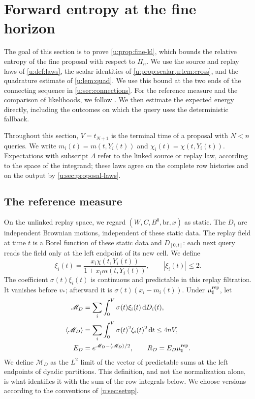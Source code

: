 \chapter{Forward entropy at the fine horizon}\label{u:sec:fine}

The goal of this section is to prove \cref{u:prop:fine-kl}, which bounds
the relative entropy of the fine proposal with respect to $\Pi_n$.
We use the source and replay laws of \cref{u:def:laws}, the scalar
identities of \cref{u:prop:scalar,u:lem:cross}, and the quadrature estimate
of \cref{u:lem:quad}. We use this bound at the two ends of the
connecting sequence in \cref{u:sec:connections}.
For the reference measure and the comparison of likelihoods, we follow
\cite[Section~4, Proposition~5]{oai-typical-upper}. We then estimate the
expected energy directly, including the outcomes on which the query uses
the deterministic fallback.

Throughout this section, $V=t_{N+1}$ is the terminal time of a proposal
with $N<n$ queries. We write $m_i(t)=m(t,Y_i(t))$ and
$\chi_i(t)=\chi(t,Y_i(t))$. Expectations with subscript $\Lambda$
refer to the linked source or replay law, according to the space of
the integrand; these laws agree on the complete row histories and on
the output by \cref{u:sec:proposal-laws}.

\section{The reference measure}
\label{u:sec:reference}

On the unlinked replay space, we regard $(W,C,B^0,\mathrm{br},x)$ as static.
The $D_i$ are independent Brownian motions, independent of these
static data. The replay field at time $t$ is a Borel function of these
static data and $D_{[0,t]}$: each next query reads the field only at
the left endpoint of its new cell. We define
\begin{equation}\label{u:eq:reference-coefficient}
 \xi_i(t)=\frac{x_i \chi(t,Y_i(t))}{1+x_i m(t,Y_i(t))},\qquad
 |\xi_i(t)|\le2.
\end{equation}
The coefficient $\sigma(t)\xi_i(t)$ is continuous and predictable in this replay filtration.
It vanishes before $v_*$; afterward it is $\sigma(t)(x_i-m_i(t))$.
Under $\mu^{\rm rep}_0$, let
\begin{equation}\label{u:eq:reference-density}
 \begin{aligned}
 \mathscr M_D&=\sum_i\int_0^V\sigma(t)\xi_i(t)\,\mathrm d D_i(t),\\
 \langle\mathscr M_D\rangle
   &=\sum_i\int_0^V\sigma(t)^2\xi_i(t)^2\,\mathrm d t\le4nV,\\
 E_D&=e^{\mathscr M_D-\langle\mathscr M_D\rangle/2},\qquad
 R_D=E_D\mu^{\rm rep}_0.
 \end{aligned}
\end{equation}
We define $\mathscr M_D$ as the $L^2$ limit of the vector of
predictable sums at the left endpoints of dyadic partitions. This
definition, and not the normalization alone, is what identifies it
with the sum of the row integrals below. We choose versions according to the
conventions of \cref{u:sec:setup}.


